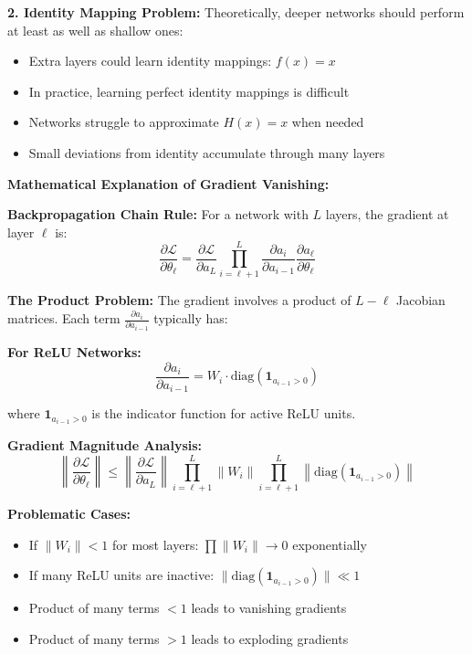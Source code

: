 \documentclass[12pt]{article}
\begin{document}
\begin{enumerate}[(a)]
{    \textbf{2. Identity Mapping Problem:}
    Theoretically, deeper networks should perform at least as well as shallow ones:
    \begin{itemize}
        \item Extra layers could learn identity mappings: $f(x) = x$
        \item In practice, learning perfect identity mappings is difficult
        \item Networks struggle to approximate $H(x) = x$ when needed
        \item Small deviations from identity accumulate through many layers
    \end{itemize}
    
    \textbf{Mathematical Explanation of Gradient Vanishing:}
    
    \textbf{Backpropagation Chain Rule:}
    For a network with $L$ layers, the gradient at layer $\ell$ is:
    $$\frac{\partial \mathcal{L}}{\partial \theta_\ell} = \frac{\partial \mathcal{L}}{\partial a_L} \prod_{i=\ell+1}^L \frac{\partial a_i}{\partial a_{i-1}} \frac{\partial a_\ell}{\partial \theta_\ell}$$
    
    \textbf{The Product Problem:}
    The gradient involves a product of $L-\ell$ Jacobian matrices. Each term $\frac{\partial a_i}{\partial a_{i-1}}$ typically has:
    
    \textbf{For ReLU Networks:}
    $$\frac{\partial a_i}{\partial a_{i-1}} = W_i \cdot \text{diag}(\mathbf{1}_{a_{i-1} > 0})$$
    
    where $\mathbf{1}_{a_{i-1} > 0}$ is the indicator function for active ReLU units.
    
    \textbf{Gradient Magnitude Analysis:}
    $$\left\|\frac{\partial \mathcal{L}}{\partial \theta_\ell}\right\| \leq \left\|\frac{\partial \mathcal{L}}{\partial a_L}\right\| \prod_{i=\ell+1}^L \left\|W_i\right\| \prod_{i=\ell+1}^L \left\|\text{diag}(\mathbf{1}_{a_{i-1} > 0})\right\|$$
    
    \textbf{Problematic Cases:}
    \begin{itemize}
        \item If $\|W_i\| < 1$ for most layers: $\prod \|W_i\| \rightarrow 0$ exponentially
        \item If many ReLU units are inactive: $\|\text{diag}(\mathbf{1}_{a_{i-1} > 0})\| \ll 1$
        \item Product of many terms $< 1$ leads to vanishing gradients
        \item Product of many terms $> 1$ leads to exploding gradients
    \end{itemize}
    
}
\end{enumerate}
\end{document}
